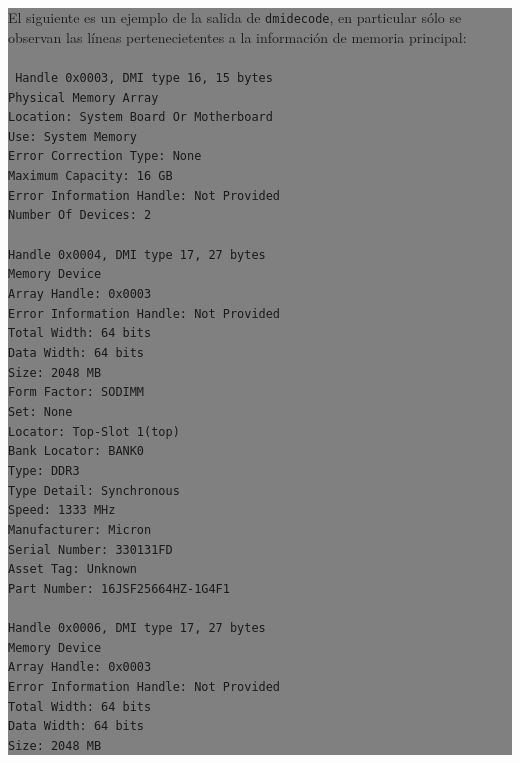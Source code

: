 \documentclass[12pt]{article}
\begin{document}
\colorbox{grey}{\parbox[t]{0.95\linewidth}{ \vspace*{0.5cm} { 
El siguiente es un ejemplo de la salida de \texttt{dmidecode}, en 
particular sólo se observan las líneas pertenecietentes a la 
información de memoria principal: \\ 
\\ 
{\tt
Handle 0x0003, DMI type 16, 15 bytes\\
Physical Memory Array\\
	Location: System Board Or Motherboard\\
	Use: System Memory\\
	Error Correction Type: None\\
	Maximum Capacity: 16 GB\\
	Error Information Handle: Not Provided\\
	Number Of Devices: 2\\
\\
Handle 0x0004, DMI type 17, 27 bytes\\
Memory Device\\
	Array Handle: 0x0003\\
	Error Information Handle: Not Provided\\
	Total Width: 64 bits\\
	Data Width: 64 bits\\
	Size: 2048 MB\\
	Form Factor: SODIMM\\
	Set: None\\
	Locator: Top-Slot 1(top)\\
	Bank Locator: BANK0\\
	Type: DDR3\\
	Type Detail: Synchronous\\
	Speed: 1333 MHz\\
	Manufacturer: Micron\\
	Serial Number: 330131FD\\
	Asset Tag: Unknown\\
	Part Number: 16JSF25664HZ-1G4F1\\
\\
Handle 0x0006, DMI type 17, 27 bytes\\
Memory Device\\
	Array Handle: 0x0003\\
	Error Information Handle: Not Provided\\
	Total Width: 64 bits\\
	Data Width: 64 bits\\
	Size: 2048 MB\\
}}}}
\end{document}

